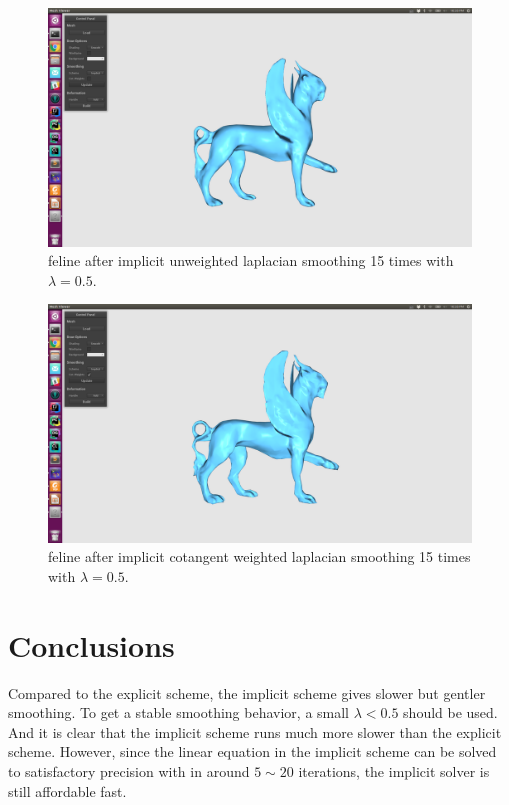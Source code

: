 \documentclass[twocolumn, a4paper]{article}
\begin{document}
\begin{figure}[H]
	\centering
	\includegraphics[width=1.0\linewidth]{feline_in_15.png}
	\caption{feline after implicit unweighted laplacian smoothing 15 times with $\lambda=0.5$.}
\end{figure}
\begin{figure}[H]
	\centering
	\includegraphics[width=1.0\linewidth]{feline_ic_15.png}
	\caption{feline after implicit cotangent weighted laplacian smoothing 15 times with $\lambda=0.5$.}
\end{figure}

\section{Conclusions}
Compared to the explicit scheme, the implicit scheme gives slower but gentler smoothing. To get a stable smoothing behavior, a small $\lambda<0.5$ should be used. And it is clear that the implicit scheme runs much more slower than the explicit scheme. However, since the linear equation in the implicit scheme can be solved to satisfactory precision with in around $5\sim20$ iterations, the implicit solver is still affordable fast. 
\end{document}
